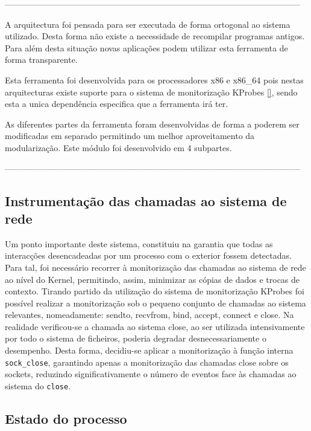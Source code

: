 ---------------------------------------------------------------------------------------------------------

A arquitectura foi pensada para ser executada de forma ortogonal ao sistema
utilizado. Desta forma não existe a necessidade de recompilar programas
antigos. Para além desta situação novas aplicações podem utilizar esta
ferramenta de forma transparente.

Esta ferramenta foi desenvolvida para os processadores x86 e x86\_64 pois nestas
arquitecturas existe suporte para o sistema de monitorização KProbes \ref{},
sendo esta a unica dependência especifica que a ferramenta irá ter.

As diferentes partes da ferramenta foram desenvolvidas de forma a poderem ser
modificadas em separado permitindo um melhor aproveitamento da modularização.
Este módulo foi desenvolvido em 4 subpartes. 

---------------------------------------------------------------------------------------------------------


\subsection*{Instrumentação das chamadas ao sistema de rede}
\label{sub:mon_syscalls}

Um ponto importante deste sistema, constituiu na garantia que todas as interacções desencadeadas por um processo com o exterior fossem detectadas. Para tal, foi necessário recorrer à monitorização das chamadas ao sistema de rede ao nível do Kernel, permitindo, assim, minimizar as cópias de dados e trocas de contexto. Tirando partido da utilização do sistema de monitorização KProbes foi possível realizar a monitorização sob o pequeno conjunto de chamadas ao sistema relevantes, nomeadamente: sendto, recvfrom, bind, accept, connect e close.
 Na realidade verificou-se a chamada ao sistema close, ao ser utilizada intensivamente por todo o sistema de ficheiros, poderia degradar desnecessariamente o desempenho. Desta forma, decidiu-se aplicar a monitorização à função interna \texttt{sock\_close}, garantindo apenas a monitorização das chamadas close sobre os sockets, reduzindo significativamente o número de eventos face às chamadas ao sistema do \texttt{close}.

\subsection*{Estado do processo}
\label{sub:data_repository}

